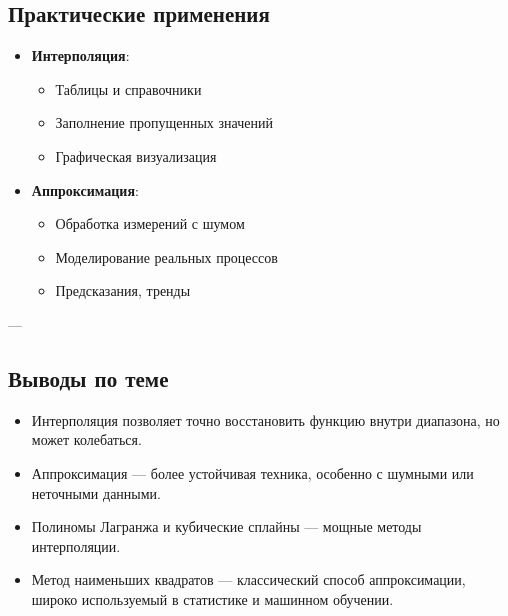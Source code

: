 \subsection*{Практические применения}

\begin{itemize}
  \item \textbf{Интерполяция}:
    \begin{itemize}
      \item Таблицы и справочники
      \item Заполнение пропущенных значений
      \item Графическая визуализация
    \end{itemize}
  \item \textbf{Аппроксимация}:
    \begin{itemize}
      \item Обработка измерений с шумом
      \item Моделирование реальных процессов
      \item Предсказания, тренды
    \end{itemize}
\end{itemize}

---

\subsection*{Выводы по теме}

\begin{itemize}
  \item Интерполяция позволяет точно восстановить функцию внутри диапазона, но может колебаться.
  \item Аппроксимация — более устойчивая техника, особенно с шумными или неточными данными.
  \item Полиномы Лагранжа и кубические сплайны — мощные методы интерполяции.
  \item Метод наименьших квадратов — классический способ аппроксимации, широко используемый в статистике и машинном обучении.
\end{itemize}
